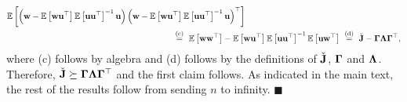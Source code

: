 {\begin{align*}
&
\mathbb{E}\left[
\left(\mathbf{w} - \mathbb{E}\left[\mathbf{w} \mathbf{u}^{\top} \right]\mathbb{E}\left[\mathbf{u} \mathbf{u}^{\top} \right]^{-1}\mathbf{u}\right)\left(\mathbf{w} - \mathbb{E}\left[\mathbf{w} \mathbf{u}^{\top} \right]\mathbb{E}\left[\mathbf{u} \mathbf{u}^{\top} \right]^{-1}\mathbf{u}\right)^{\top}
\right]\\
&~~~~~~~~~~~~~~~~~~~~~~~~~~~~~~~~~~~~~~~~~~~~~~~~~~~~~~~~~~~\stackrel{\text{(c)}}{=}~\mathbb{E}\left[\mathbf{w} \mathbf{w}^{\top} \right] - \mathbb{E}\left[\mathbf{w} \mathbf{u}^{\top} \right]\mathbb{E}\left[\mathbf{u} \mathbf{u}^{\top} \right]^{-1}\mathbb{E}\left[\mathbf{u} \mathbf{w}^{\top} \right]~\stackrel{\text{(d)}}{=}~\check{\mathbf{J}} - \bm{\Gamma}\bm{\Lambda}\bm{\Gamma}^{\top},
\end{align*}
where (c) follows by algebra and (d) follows by the definitions of $\check{\mathbf{J}}$, $\bm{\Gamma}$ and $\bm{\Lambda}$.
Therefore, $\check{\mathbf{J}} \succeq \bm{\Gamma}\bm{\Lambda}\bm{\Gamma}^{\top}$ and the first claim follows.
As indicated in the main text, the rest of the results follow from sending $n$ to infinity. 
\hfill $\blacksquare$
\vspace{3mm}}

